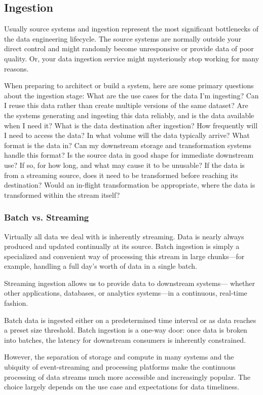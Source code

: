\documentclass[12pt]{book}
\begin{document}
\subsection{Ingestion}
Usually source systems and ingestion represent the most significant bottlenecks of the data engineering lifecycle.
The source systems are normally outside your direct control and might randomly become unresponsive or provide data of poor quality. Or, your data ingestion service might mysteriously stop working for many reasons.

When preparing to architect or build a system, here are some primary
questions about the ingestion stage:
What are the use cases for the data I’m ingesting? Can I reuse this data
rather than create multiple versions of the same dataset?
Are the systems generating and ingesting this data reliably, and is the
data available when I need it?
What is the data destination after ingestion?
How frequently will I need to access the data?
In what volume will the data typically arrive?
What format is the data in? Can my downstream storage and
transformation systems handle this format?
Is the source data in good shape for immediate downstream use? If so,
for how long, and what may cause it to be unusable?
If the data is from a streaming source, does it need to be transformed
before reaching its destination? Would an in-flight transformation be
appropriate, where the data is transformed within the stream itself?

\subsubsection{Batch vs. Streaming}
Virtually all data we deal with is inherently streaming. Data is nearly
always produced and updated continually at its source. Batch ingestion is
simply a specialized and convenient way of processing this stream in large
chunks—for example, handling a full day’s worth of data in a single batch.

Streaming ingestion allows us to provide data to downstream systems—
whether other applications, databases, or analytics systems—in a
continuous, real-time fashion.

Batch data is ingested either on a predetermined time interval or as data
reaches a preset size threshold. Batch ingestion is a one-way door: once
data is broken into batches, the latency for downstream consumers is
inherently constrained.

However, the separation of storage and compute in many systems and the
ubiquity of event-streaming and processing platforms make the continuous
processing of data streams much more accessible and increasingly popular.
The choice largely depends on the use case and expectations for data
timeliness.
\end{document}
